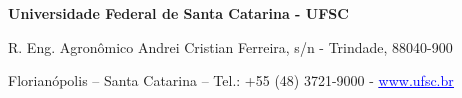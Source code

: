 \documentclass[english]{cat-ufsc}
\begin{document}
    \vfill

    \begin{center}

        \footnotesize \textbf{Universidade Federal de Santa Catarina - UFSC}

        \footnotesize R. Eng. Agronômico Andrei Cristian Ferreira, s/n - Trindade, 88040-900

        \footnotesize Florianópolis – Santa Catarina – Tel.: +55 (48) 3721-9000  - \href{http://www.ufsc.br/}{\textcolor{blue}{\underline{www.ufsc.br}}}
    \end{center}

    \newpage

    \generatesummary

    \generatedefinitionsandacronyms

    \generatelistoffigures

    \generatelistoftables

    \startdocumentcontent

    \setcounter{page}{1}

    
    
    
    
    
    
    
    
    
    

    \finishdocumentcontent

    \newpage
\end{document}
